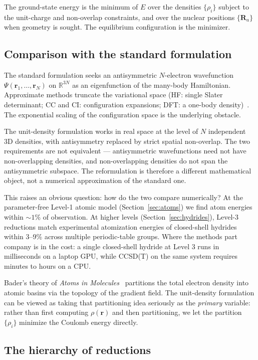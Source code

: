\documentclass[11pt]{article}
\begin{document}
The ground-state energy is the minimum of $E$ over the densities $\{\rho_i\}$ subject to the unit-charge and non-overlap constraints, and over the nuclear positions $\{\mathbf{R}_a\}$ when geometry is sought. The equilibrium configuration is the minimizer.

\subsection{Comparison with the standard formulation}

The standard formulation seeks an antisymmetric $N$-electron wavefunction $\Psi(\mathbf{r}_1, \ldots, \mathbf{r}_N)$ on $\mathbb{R}^{3N}$ as an eigenfunction of the many-body Hamiltonian. Approximate methods truncate the variational space (HF: single Slater determinant; CC and CI: configuration expansions; DFT: a one-body density)~\cite{KS65,MHG17}. The exponential scaling of the configuration space is the underlying obstacle.

The unit-density formulation works in real space at the level of $N$ independent 3D densities, with antisymmetry replaced by strict spatial non-overlap. The two requirements are not equivalent --- antisymmetric wavefunctions need not have non-overlapping densities, and non-overlapping densities do not span the antisymmetric subspace. The reformulation is therefore a different mathematical object, not a numerical approximation of the standard one.

This raises an obvious question: how do the two compare numerically? At the parameter-free Level-1 atomic model (Section~\ref{sec:atoms}) we find atom energies within ${\sim}1\%$ of observation. At higher levels (Section~\ref{sec:hydrides}), Level-3 reductions match experimental atomization energies of closed-shell hydrides within 3--9\% across multiple periodic-table groups. Where the methods part company is in the cost: a single closed-shell hydride at Level 3 runs in milliseconds on a laptop GPU, while CCSD(T) on the same system requires minutes to hours on a CPU.

Bader's theory of \emph{Atoms in Molecules}~\cite{Bader90} partitions the total electron density into atomic basins via the topology of the gradient field. The unit-density formulation can be viewed as taking that partitioning idea seriously as the \emph{primary} variable: rather than first computing $\rho(\mathbf{r})$ and then partitioning, we let the partition $\{\rho_i\}$ minimize the Coulomb energy directly.

\subsection{The hierarchy of reductions}
\end{document}
